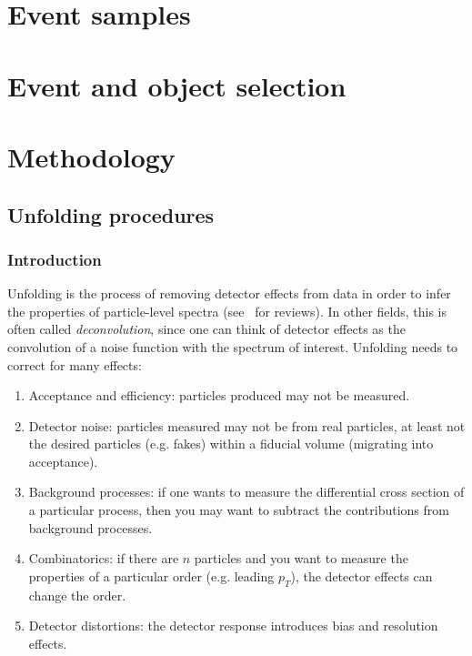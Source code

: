 \documentclass[NOTE, atlasdraft=true, texlive=2016, UKenglish]{\ATLASLATEXPATH atlasdoc}
\begin{document}
\section{Event samples}
\label{sec:samples}


\section{Event and object selection}
\label{sec:objects}



\section{Methodology}
\label{sec:strategy}

\subsection{Unfolding procedures}

\subsubsection{Introduction}

Unfolding is the process of removing detector effects from data in order to infer the properties of particle-level spectra (see~\cite{Cowan:2002in,Blobel:2203257,doi:10.1002/9783527653416.ch6,Balasubramanian:2019itp} for reviews).  In other fields, this is often called \textit{deconvolution}, since one can think of detector effects as the convolution of a noise function with the spectrum of interest.  Unfolding needs to correct for many effects:

\begin{enumerate}[label={(\arabic*)}]
\item Acceptance and efficiency: particles produced may not be measured.
\item Detector noise: particles measured may not be from real particles, at least not the desired particles (e.g. fakes) within a fiducial volume (migrating into acceptance).
\item Background processes: if one wants to measure the differential cross section of a particular process, then you may want to subtract the contributions from background processes.
\item Combinatorics: if there are $n$ particles and you want to measure the properties of a particular order (e.g. leading $p_T$), the detector effects can change the order.
\item Detector distortions: the detector response introduces bias and resolution effects.
\end{enumerate}
\end{document}
